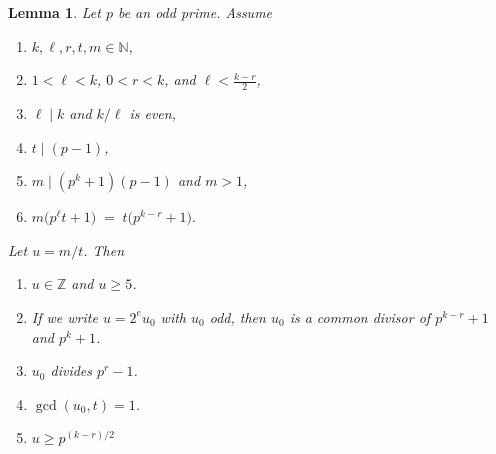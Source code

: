 \documentclass[10pt,a4paper]{amsart}
\newtheorem{lemma}{Lemma}
\begin{document}
\begin{lemma}\label{general_div}
Let $p$ be an odd prime. Assume
\begin{enumerate}
  \item $k,\ell,r,t,m\in\mathbb{N}$, 
  \item $1<\ell < k$,  $0<r<k$, and $\ell < \frac{k-r}{2}$,
  \item $\ell\mid k$ and $k/\ell$ is even,
  \item $t\mid (p-1)$,
  \item $m\mid (p^k+1)(p-1)$ and $m>1$,
  \item $m\bigl(p^\ell t+1\bigr) \;=\; t\bigl(p^{k-r}+1\bigr).$
\end{enumerate}
Let $u=m/t$. Then 
\begin{enumerate}
\item $u\in \mathbb{Z}$ and $u\ge 5$.
\item If we write $u = 2^e u_0$ with $u_0$ odd,
then $u_0$ is a common divisor of $p^{k-r}+1$ and $p^k+1$.
\item $u_0$ divides $p^r-1$.
\item $\gcd(u_0,t)=1$.
\item $u \ge p^{(k-r)/2}$
\end{enumerate}
\end{lemma}
\end{document}

